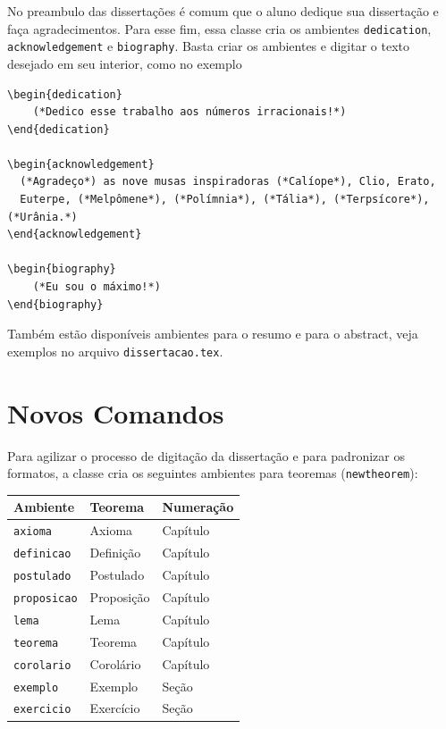 \documentclass[fleqn]{icat-ufal}
\newcommand{\texfile}  {\texttt{dissertacao.tex}}
\begin{document}
No preambulo das dissertações é comum que o aluno dedique sua dissertação e faça
agradecimentos. Para esse fim, essa classe cria os ambientes 
\lstinline!dedication!, 
\lstinline!acknowledgement! e
\lstinline!biography!.
Basta criar os ambientes e digitar o texto desejado em seu interior,
como no exemplo
\begin{lstlisting}
\begin{dedication} 
    (*Dedico esse trabalho aos números irracionais!*)
\end{dedication}

\begin{acknowledgement} 
  (*Agradeço*) as nove musas inspiradoras (*Calíope*), Clio, Erato, 
  Euterpe, (*Melpômene*), (*Polímnia*), (*Tália*), (*Terpsícore*), (*Urânia.*)
\end{acknowledgement}

\begin{biography} 
    (*Eu sou o máximo!*)
\end{biography}
\end{lstlisting}

Também estão disponíveis ambientes para o resumo e para o abstract, 
veja exemplos no arquivo \texfile{}.

\section{Novos Comandos}
\label{sec:novos_comandos}

Para agilizar o processo de digitação da dissertação e para padronizar os
formatos, a classe cria os seguintes ambientes para teoremas
(\lstinline!newtheorem!):
\begin{center}
    \begin{tabular}{lll}
            \hline
            Ambiente               & Teorema    & Numeração \\ \hline
            \lstinline!axioma!     & Axioma     & Capítulo  \\
            \lstinline!definicao!  & Definição  & Capítulo  \\
            \lstinline!postulado!  & Postulado  & Capítulo  \\
            \lstinline!proposicao! & Proposição & Capítulo  \\
            \lstinline!lema!       & Lema       & Capítulo  \\
            \lstinline!teorema!    & Teorema    & Capítulo  \\
            \lstinline!corolario!  & Corolário  & Capítulo  \\
            \lstinline!exemplo!    & Exemplo    & Seção     \\
            \lstinline!exercicio!  & Exercício  & Seção     \\ \hline
    \end{tabular}
\end{center}
\end{document}
